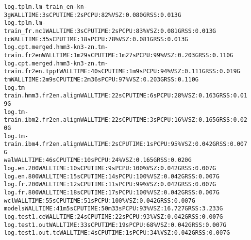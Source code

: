 \documentclass[11pt,letterpaper]{article}
\begin{document}
\begin{tiny}
\begin{alltt}
         log.tplm.lm-train_en-kn-3g                       WALL TIME: 3s       CPU TIME: 2s        PCPU: 82\%    VSZ: 0.080G    RSS: 0.013G
         log.tplm.lm-train_fr.nc1                         WALL TIME: 3s       CPU TIME: 2s        PCPU: 83\%    VSZ: 0.081G    RSS: 0.013G
      tc                                                  WALL TIME: 35s      CPU TIME: 18s       PCPU: 78\%    VSZ: 0.081G    RSS: 0.013G
         log.cpt.merged.hmm3-kn3-zn.tm-train.fr2en        WALL TIME: 1m29s    CPU TIME: 1m27s     PCPU: 99\%    VSZ: 0.203G    RSS: 0.110G
         log.cpt.merged.hmm3-kn3-zn.tm-train.fr2en.tppt   WALL TIME: 40s      CPU TIME: 1m9s      PCPU: 94\%    VSZ: 0.111G    RSS: 0.019G
      tm                                                  WALL TIME: 2m9s     CPU TIME: 2m36s     PCPU: 97\%    VSZ: 0.203G    RSS: 0.110G
         log.tm-train.hmm3.fr2en.align                    WALL TIME: 22s      CPU TIME: 6s        PCPU: 28\%    VSZ: 0.163G    RSS: 0.019G
         log.tm-train.ibm2.fr2en.align                    WALL TIME: 22s      CPU TIME: 3s        PCPU: 16\%    VSZ: 0.165G    RSS: 0.020G
         log.tm-train.ibm4.fr2en.align                    WALL TIME: 2s       CPU TIME: 1s        PCPU: 95\%    VSZ: 0.042G    RSS: 0.007G
      wal                                                 WALL TIME: 46s      CPU TIME: 10s       PCPU: 24\%    VSZ: 0.165G    RSS: 0.020G
         log.en.200                                       WALL TIME: 10s      CPU TIME: 9s        PCPU: 100\%   VSZ: 0.042G    RSS: 0.007G
         log.en.800                                       WALL TIME: 15s      CPU TIME: 14s       PCPU: 100\%   VSZ: 0.042G    RSS: 0.007G
         log.fr.200                                       WALL TIME: 12s      CPU TIME: 11s       PCPU: 99\%    VSZ: 0.042G    RSS: 0.007G
         log.fr.800                                       WALL TIME: 18s      CPU TIME: 17s       PCPU: 100\%   VSZ: 0.042G    RSS: 0.007G
      wcl                                                 WALL TIME: 55s      CPU TIME: 51s       PCPU: 100\%   VSZ: 0.042G    RSS: 0.007G
   models                                                 WALL TIME: 41m5s    CPU TIME: 50m33s    PCPU: 93\%    VSZ: 16.727G   RSS: 3.233G
      log.test1.ce                                        WALL TIME: 24s      CPU TIME: 22s       PCPU: 93\%    VSZ: 0.042G    RSS: 0.007G
      log.test1.out                                       WALL TIME: 33s      CPU TIME: 19s       PCPU: 68\%    VSZ: 0.042G    RSS: 0.007G
      log.test1.out.tc                                    WALL TIME: 4s       CPU TIME: 1s        PCPU: 34\%    VSZ: 0.042G    RSS: 0.007G

\end{alltt}
\end{tiny}
\end{document}
